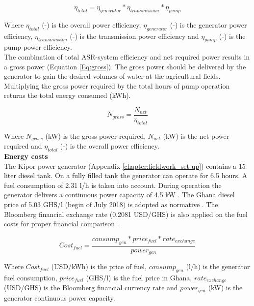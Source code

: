 \begin{equation}
 \eta_{total} =   \eta_{generator} * \eta_{transmission} * \eta_{pump} \end{equation}

Where $\eta_{total}$ (-) is the overall power efficiency, $\eta_{generator}$ (-) is the generator power efficiency, $\eta_{transmission}$ (-) is the transmission power efficiency and $\eta_{pump}$ (-) is the pump power efficiency. \\

The combination of total ASR-system efficiency and net required power results in a gross power (Equation \ref{Eq:gross}). The gross power should be delivered by the generator to gain the desired volumes of water at the agricultural fields. Multiplying the gross power required by the total hours of pump operation returns the total energy consumed (kWh).

\begin{equation}
 N_{gross} =   \frac{N_{net}}{\eta_{total}}
\label{Eq:gross}
\end{equation}

Where $N_{gross}$ (kW) is the gross power required, $N_{net}$ (kW) is the net power required and $\eta_{total}$ (-) is the overall power efficiency. \\

\textbf{Energy costs} \\
The Kipor power generator (Appendix \ref{chapter:fieldwork_set-up}) contains a 15 liter diesel tank. On a fully filled tank the generator can operate for 6.5 hours. A fuel consumption of 2.31 l/h is taken into account. During operation the generator delivers a continuous power capacity of 4.5 kW \citep{TS242018}. The Ghana diesel price of 5.03 GHS/l (begin of July 2018) is adopted as normative \citep{GlobalPetrolPrices2018}. The Bloomberg financial exchange rate (0.2081 USD/GHS) is also applied on the fuel costs for proper financial comparison \citep{Bloomberg2018}.

\begin{equation}
 Cost_{fuel} =  \frac{consump_{gen} * price_{fuel} * rate_{exchange}}{power_{gen}}
\end{equation}

Where $Cost_{fuel}$ (USD/kWh) is the price of fuel,  $consump_{gen}$ (l/h) is the generator fuel consumption,  $price_{fuel}$ (GHS/l) is the fuel price in Ghana, $rate_{exchange}$ (USD/GHS) is the Bloomberg financial currency rate and $power_{gen}$ (kW) is the generator continuous power capacity. \\

